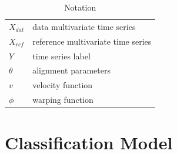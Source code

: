 \begin{table}[!htb]
    \caption{Notation}
    \label{tab:phm_notation}
    \vspace{-1em}
    \begin{center}
    \begin{tabular}{ll}
    \toprule
    $X_{dat}$ & data multivariate time series \\
    $X_{ref}$ & reference multivariate time series \\
    $Y$ & time series label \\
    $\theta$ & alignment parameters \\
    $v$ & velocity function \\
    $\phi$ & warping function \\ \bottomrule
    \end{tabular}
\end{center}
\end{table}


\section{Classification Model}\label{sec:method_4}


